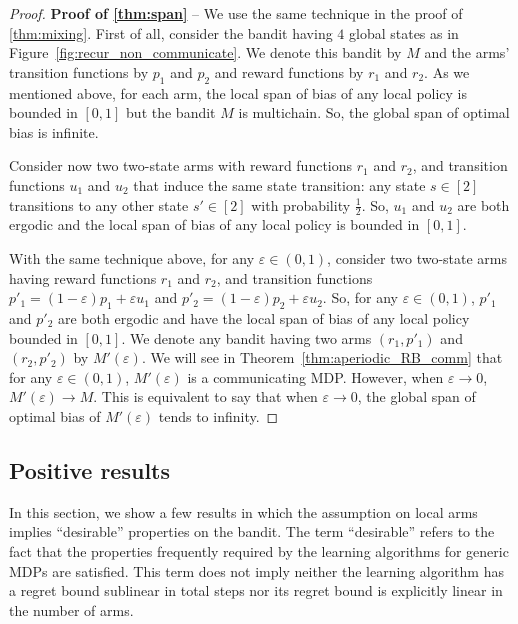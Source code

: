 \begin{proof}
    \textbf{Proof of \ref{thm:span}} -- We use the same technique in the proof of \ref{thm:mixing}.
    First of all, consider the bandit having $4$ global states as in Figure~\ref{fig:recur_non_communicate}.
    We denote this bandit by $M$ and the arms' transition functions by $p_1$ and $p_2$ and reward functions by $r_1$ and $r_2$.
    As we mentioned above, for each arm, the local span of bias of any local policy is bounded in $[0,1]$ but the bandit $M$ is multichain.
    So, the global span of optimal bias is infinite.

    Consider now two two-state arms with reward functions $r_1$ and $r_2$, and transition functions $u_1$ and $u_2$ that induce the same state transition: any state $s\in[2]$ transitions to any other state $s'\in[2]$ with probability $\frac12$.
    So, $u_1$ and $u_2$ are both ergodic and the local span of bias of any local policy is bounded in $[0,1]$.

    With the same technique above, for any $\varepsilon\in(0,1)$, consider two two-state arms having reward functions $r_1$ and $r_2$, and transition functions $p'_1=(1-\varepsilon)p_1+\varepsilon u_1$ and $p'_2=(1-\varepsilon)p_2+\varepsilon u_2$.
    So, for any $\varepsilon\in(0,1)$, $p'_1$ and $p'_2$ are both ergodic and have the local span of bias of any local policy bounded in $[0,1]$.
    We denote any bandit having two arms $(r_1,p'_1)$ and $(r_2,p'_2)$ by $M'(\varepsilon)$.
    We will see in Theorem~\ref{thm:aperiodic_RB_comm} that for any $\varepsilon\in(0,1)$, $M'(\varepsilon)$ is a communicating MDP.
    However, when $\varepsilon\to0$, $M'(\varepsilon)\to M$.
    This is equivalent to say that when $\varepsilon\to0$, the global span of optimal bias of $M'(\varepsilon)$ tends to infinity.
\end{proof}

\subsection{Positive results}

In this section, we show a few results in which the assumption on local arms implies ``desirable'' properties on the bandit.
The term ``desirable'' refers to the fact that the properties frequently required by the learning algorithms for generic MDPs are satisfied.
This term does not imply neither the learning algorithm has a regret bound sublinear in total steps nor its regret bound is explicitly linear in the number of arms.

